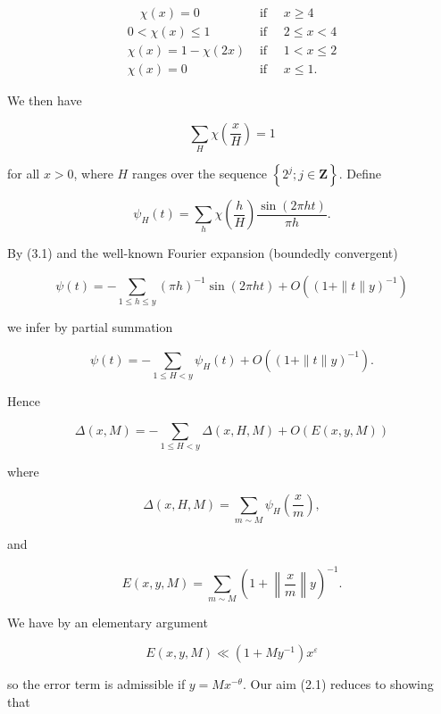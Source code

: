 \documentclass[10pt]{article}
\begin{document}
$$
\begin{aligned}
\quad \chi(x)=0 & \text { if } \quad x \geqslant 4 \\
0<\chi(x) \leqslant 1 & \text { if } \quad 2 \leqslant x<4 \\
\chi(x)=1-\chi(2 x) & \text { if } \quad 1<x \leqslant 2 \\
\chi(x)=0 & \text { if } \quad x \leqslant 1 .
\end{aligned}
$$

We then have


\begin{equation*}
\sum_{H} \chi\left(\frac{x}{H}\right)=1 \tag{3.1}
\end{equation*}


for all $x>0$, where $H$ ranges over the sequence $\left\{2^{j} ; j \in \mathbf{Z}\right\}$. Define

$$
\psi_{H}(t)=\sum_{h} \chi\left(\frac{h}{H}\right) \frac{\sin (2 \pi h t)}{\pi h} .
$$

By (3.1) and the well-known Fourier expansion (boundedly convergent)

$$
\psi(t)=-\sum_{1 \leqslant h \leqslant y}(\pi h)^{-1} \sin (2 \pi h t)+O\left((1+\|t\| y)^{-1}\right)
$$

we infer by partial summation

$$
\psi(t)=-\sum_{1 \leqslant H<y} \psi_{H}(t)+O\left((1+\|t\| y)^{-1}\right) .
$$

Hence

$$
\Delta(x, M)=-\sum_{1 \leqslant H<y} \Delta(x, H, M)+O(E(x, y, M))
$$

where

$$
\Delta(x, H, M)=\sum_{m \sim M} \psi_{H}\left(\frac{x}{m}\right),
$$

and

$$
E(x, y, M)=\sum_{m \sim M}\left(1+\left\|\frac{x}{m}\right\| y\right)^{-1} .
$$

We have by an elementary argument

$$
E(x,y,M)\ll\left(1+My^{-1}\right)x^{\varepsilon}
$$

so the error term is admissible if $y=M x^{-\theta}$. Our aim (2.1) reduces to showing that
\end{document}
